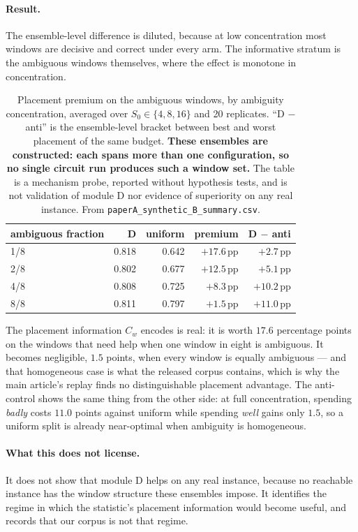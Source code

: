 \documentclass[final,5p,times,longtitle]{elsarticle}
\theoremstyle{plain}
\newcommand{\Cw}{C_w}
\begin{document}
\paragraph{Result.} The ensemble-level difference is diluted, because at
low concentration most windows are decisive and correct under every arm.
The informative stratum is the ambiguous windows themselves, where the
effect is monotone in concentration.

\begin{table}[h]
\centering
\small
\caption{Placement premium on the ambiguous windows, by ambiguity
concentration, averaged over $S_0\in\{4,8,16\}$ and 20 replicates.
``D $-$ anti'' is the ensemble-level bracket between best and worst
placement of the same budget. \textbf{These ensembles are constructed: each
spans more than one configuration, so no single circuit run produces such a
window set.} The table
is a mechanism probe, reported without hypothesis tests, and is not
validation of module D nor evidence of superiority on any real instance.
From \texttt{paperA\_synthetic\_B\_summary.csv}.}
\label{tab:familyB}
\begin{tabular}{@{}lrrrr@{}}
\toprule
ambiguous fraction & D & uniform & premium & D $-$ anti \\
\midrule
1/8 & 0.818 & 0.642 & $+17.6$\,pp & $+2.7$\,pp \\
2/8 & 0.802 & 0.677 & $+12.5$\,pp & $+5.1$\,pp \\
4/8 & 0.808 & 0.725 & $+8.3$\,pp  & $+10.2$\,pp \\
8/8 & 0.811 & 0.797 & $+1.5$\,pp  & $+11.0$\,pp \\
\bottomrule
\end{tabular}
\end{table}

The placement information $\Cw$ encodes is real: it is worth $17.6$
percentage points on the windows that need help when one window in eight is
ambiguous. It becomes negligible, $1.5$ points, when every window is
equally ambiguous --- and that homogeneous case is what the released corpus
contains, which is why the main article's replay finds no distinguishable
placement advantage. The anti-control shows the same thing from the other
side: at full concentration, spending \emph{badly} costs $11.0$ points
against uniform while spending \emph{well} gains only $1.5$, so a uniform
split is already near-optimal when ambiguity is homogeneous.

\paragraph{What this does not license.} It does not show that module D
helps on any real instance, because no reachable instance has the window
structure these ensembles impose. It identifies the regime in which the
statistic's placement information would become useful, and records that our
corpus is not that regime.
\end{document}
